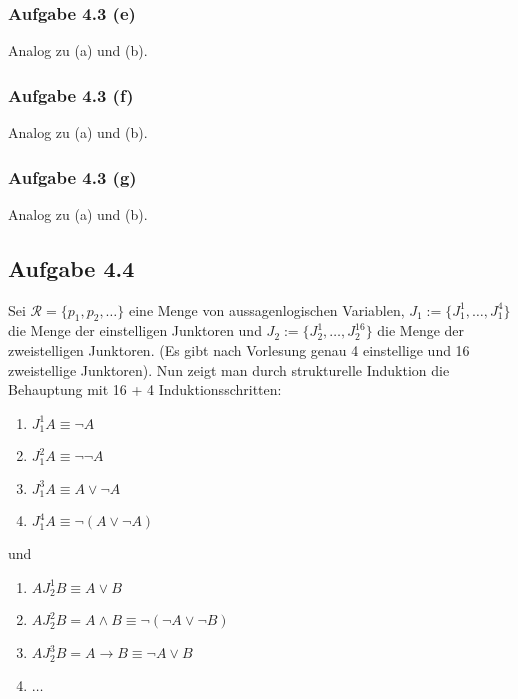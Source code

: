 \subsubsection{Aufgabe 4.3 (e)}
Analog zu (a) und (b).

\subsubsection{Aufgabe 4.3 (f)}
Analog zu (a) und (b).

\subsubsection{Aufgabe 4.3 (g)}
Analog zu (a) und (b).

\subsection{Aufgabe 4.4}
Sei $\mathcal{R}=\lbrace p_1,p_2,\ldots\rbrace$ eine Menge von aussagenlogischen Variablen, $J_1:=\lbrace J_1^1,\ldots,J_1^4\rbrace$ die Menge der einstelligen Junktoren und $J_2:=\lbrace J_2^1,\ldots,J_2^{16}\rbrace$ die Menge der zweistelligen Junktoren. 
(Es gibt nach Vorlesung genau 4 einstellige und 16 zweistellige Junktoren). 
Nun zeigt man durch strukturelle Induktion die Behauptung mit 16 + 4 Induktionsschritten:
\begin{enumerate}
	\item $J_1^1 A\equiv\neg A$
	\item $J_1^2 A\equiv\neg\neg A$
	\item $J_1^3 A\equiv A\vee\neg A$
	\item $J_1^4 A\equiv\neg(A\vee\neg A)$
\end{enumerate}
und
\begin{enumerate}
	\item $A J_2^1 B\equiv A\vee B$
	\item $A J_2^2 B=A\wedge B\equiv\neg(\neg A\vee\neg B)$
	\item $A J_2^3 B=A\to B\equiv\neg A\vee B$
	\item $\ldots$
\end{enumerate}

